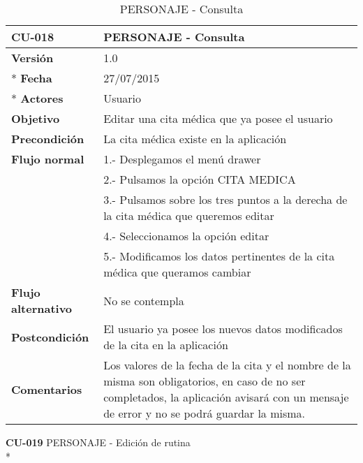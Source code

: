 \documentclass[../pfc.tex]{subfiles}
\begin{document}
		\begin{table}[H]
			\centering
			\begin{tabular}[t]{|p{3cm}|p{9.5cm}|}
				\hline \textbf{CU-018} & \textbf{PERSONAJE - Consulta} \\*
				\hline\hline \textbf{Versión} & 1.0 \\ *
				\hline\hline \textbf{Fecha} & 27/07/2015 \\ *
				\hline\textbf{Actores} 	& Usuario\\*
				\hline \textbf{Objetivo} & Editar una cita médica que ya posee el usuario\\* 			
				\hline \textbf{Precondición} & La cita médica existe en la aplicación\\* 
				\hline \textbf{Flujo normal} & 1.- Desplegamos el menú drawer \\* 
				& 2.- Pulsamos la opción CITA MEDICA\\*	
				& 3.- Pulsamos sobre los tres puntos a la derecha de la cita médica que queremos editar\\*	
				& 4.- Seleccionamos la opción editar\\*	
				& 5.- Modificamos los datos pertinentes de la cita médica que queramos cambiar\\*	
				\hline \textbf{Flujo alternativo} & No se contempla \\* 
				\hline \textbf{Postcondición} & El usuario ya posee los nuevos datos modificados de la cita en la aplicación \\* 
				\hline \textbf{Comentarios}   & Los valores de la fecha de la cita y el nombre de la misma son obligatorios, en caso de no ser completados, la aplicación avisará con un mensaje de error y no se podrá guardar la misma.\\*
				\hline
			\end{tabular}
			\caption{PERSONAJE - Consulta}
			\label{tabla:caso018}
		\end{table}
		
		
		
		
		\textbf{CU-019}	PERSONAJE - Edición de rutina\\*
		
\end{document}
